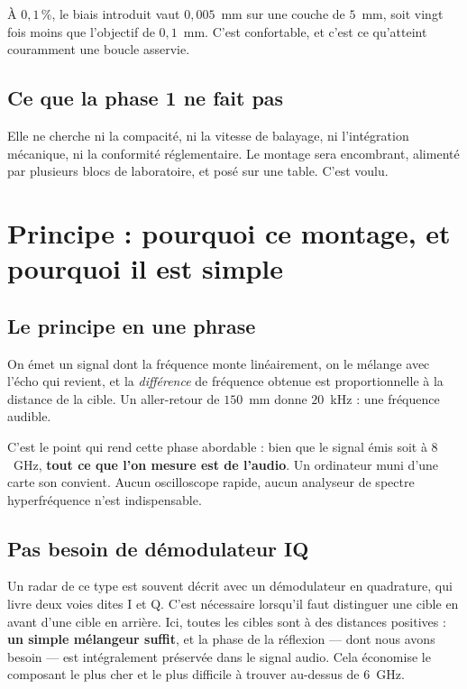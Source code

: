 À $0{,}1\,\%$, le biais introduit vaut $0{,}005$~mm sur une couche de $5$~mm,
soit vingt fois moins que l'objectif de $0{,}1$~mm. C'est confortable, et c'est
ce qu'atteint couramment une boucle asservie.

\subsection{Ce que la phase 1 ne fait pas}

Elle ne cherche ni la compacité, ni la vitesse de balayage, ni l'intégration
mécanique, ni la conformité réglementaire. Le montage sera encombrant, alimenté
par plusieurs blocs de laboratoire, et posé sur une table. C'est voulu.

\section{Principe : pourquoi ce montage, et pourquoi il est simple}

\subsection{Le principe en une phrase}

On émet un signal dont la fréquence monte linéairement, on le mélange avec
l'écho qui revient, et la \emph{différence} de fréquence obtenue est
proportionnelle à la distance de la cible. Un aller-retour de $150$~mm donne
$20$~kHz : une fréquence audible.

\begin{attention}
C'est le point qui rend cette phase abordable : bien que le signal émis soit à
$8$~GHz, \textbf{tout ce que l'on mesure est de l'audio}. Un ordinateur muni
d'une carte son convient. Aucun oscilloscope rapide, aucun analyseur de spectre
hyperfréquence n'est indispensable.
\end{attention}

\subsection{Pas besoin de démodulateur IQ}

Un radar de ce type est souvent décrit avec un démodulateur en quadrature, qui
livre deux voies dites I et Q. C'est nécessaire lorsqu'il faut distinguer une
cible en avant d'une cible en arrière. Ici, toutes les cibles sont à des
distances positives : \textbf{un simple mélangeur suffit}, et la phase de la
réflexion --- dont nous avons besoin --- est intégralement préservée dans le
signal audio. Cela économise le composant le plus cher et le plus difficile à
trouver au-dessus de $6$~GHz.

